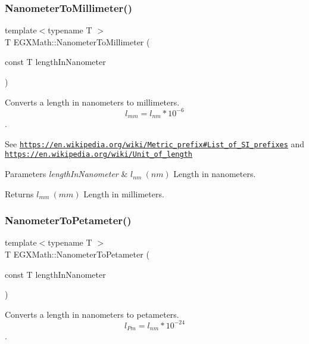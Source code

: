\subsubsection{\texorpdfstring{Nanometer\+To\+Millimeter()}{NanometerToMillimeter()}}
{\footnotesize\ttfamily template$<$typename T $>$ \\
T E\+G\+X\+Math\+::\+Nanometer\+To\+Millimeter (\begin{DoxyParamCaption}\item[{const T}]{length\+In\+Nanometer }\end{DoxyParamCaption})}



Converts a length in nanometers to millimeters. \[ l_{mm}=l_{nm} * 10^{-6} \]. 

See \href{https://en.wikipedia.org/wiki/Metric_prefix#List_of_SI_prefixes}{\tt https\+://en.\+wikipedia.\+org/wiki/\+Metric\+\_\+prefix\#\+List\+\_\+of\+\_\+\+S\+I\+\_\+prefixes} and \href{https://en.wikipedia.org/wiki/Unit_of_length}{\tt https\+://en.\+wikipedia.\+org/wiki/\+Unit\+\_\+of\+\_\+length} 
\begin{DoxyParams}{Parameters}
{\em length\+In\+Nanometer} & $ l_{nm}\ (nm)$ Length in nanometers. \\
\hline
\end{DoxyParams}
\begin{DoxyReturn}{Returns}
$ l_{mm}\ (mm)$ Length in millimeters. 
\end{DoxyReturn}
\mbox{\label{group___e_g_x_math-_conversions-_length_conversions-_s_i-_nanometer-_s_i_ga61c4ec1200cb2e909920c108d676d6e6}} 
\subsubsection{\texorpdfstring{Nanometer\+To\+Petameter()}{NanometerToPetameter()}}
{\footnotesize\ttfamily template$<$typename T $>$ \\
T E\+G\+X\+Math\+::\+Nanometer\+To\+Petameter (\begin{DoxyParamCaption}\item[{const T}]{length\+In\+Nanometer }\end{DoxyParamCaption})}



Converts a length in nanometers to petameters. \[ l_{Pm}=l_{nm} * 10^{-24} \]. 

